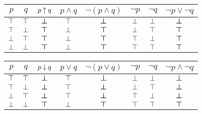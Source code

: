                 \begin{center}
                        \begin{tabular}{cc|cccccc}
                                $p$ & $q$ & $p \mathbin{\uparrow} q$ & $p \land q$ & $\lnot(p \land q)$ & $\lnot{p}$ & $\lnot{q}$ & $\lnot{p} \lor \lnot{q}$ \\
                                \hline
                                $\top$ & $\top$ & $\boldsymbol{\bot}$ & $\top$ & $\boldsymbol{\bot}$ & $\bot$ & $\bot$ & $\boldsymbol{\bot}$ \\
                                $\top$ & $\bot$ & $\boldsymbol{\top}$ & $\bot$ & $\boldsymbol{\top}$ & $\bot$ & $\top$ & $\boldsymbol{\top}$ \\
                                $\bot$ & $\top$ & $\boldsymbol{\top}$ & $\bot$ & $\boldsymbol{\top}$ & $\top$ & $\bot$ & $\boldsymbol{\top}$ \\
                                $\bot$ & $\bot$ & $\boldsymbol{\top}$ & $\bot$ & $\boldsymbol{\top}$ & $\top$ & $\top$ & $\boldsymbol{\top}$
                        \end{tabular}
                \end{center}

                \begin{center}
                        \begin{tabular}{cc|cccccc}
                                $p$ & $q$ & $p \mathbin{\downarrow} q$ & $p \lor q$ & $\lnot(p \lor q)$ & $\lnot{p}$ & $\lnot{q}$ & $\lnot{p} \land \lnot{q}$ \\
                                \hline
                                $\top$ & $\top$ & $\boldsymbol{\bot}$ & $\top$ & $\boldsymbol{\bot}$ & $\bot$ & $\bot$ & $\boldsymbol{\bot}$ \\
                                $\top$ & $\bot$ & $\boldsymbol{\bot}$ & $\top$ & $\boldsymbol{\bot}$ & $\bot$ & $\top$ & $\boldsymbol{\bot}$ \\
                                $\bot$ & $\top$ & $\boldsymbol{\bot}$ & $\top$ & $\boldsymbol{\bot}$ & $\top$ & $\bot$ & $\boldsymbol{\bot}$ \\
                                $\bot$ & $\bot$ & $\boldsymbol{\top}$ & $\bot$ & $\boldsymbol{\top}$ & $\top$ & $\top$ & $\boldsymbol{\top}$
                        \end{tabular}
                \end{center}


